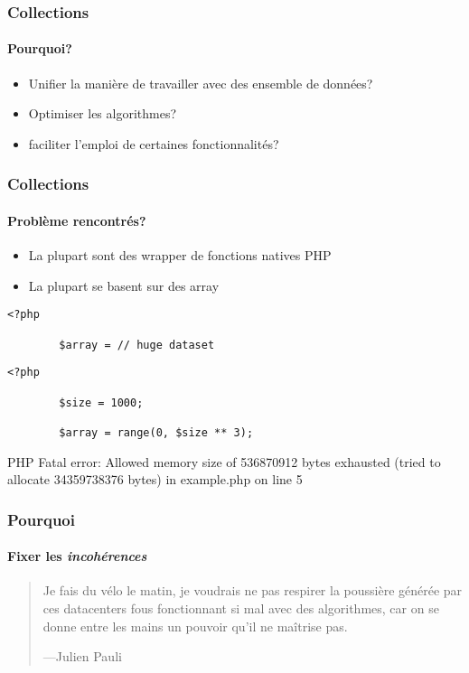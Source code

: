 \begin{frame}
	\frametitle{Collections}
    \framesubtitle{Pourquoi?}

    \begin{itemize}[<+->]
        \item Unifier la manière de travailler avec des ensemble de données?
        \item Optimiser les algorithmes?
        \item faciliter l'emploi de certaines fonctionnalités?
    \end{itemize}
\end{frame}

\begin{frame}
	\frametitle{Collections}
    \framesubtitle{Problème rencontrés?}

    \begin{itemize}[<+->]
        \item La plupart sont des wrapper de fonctions natives PHP
        \item La plupart se basent sur des array
    \end{itemize}
\end{frame}

\begin{frame}[fragile]
    \begin{lstlisting}[firstnumber=1]
        <?php

        $array = // huge dataset
    \end{lstlisting}
\end{frame}

\begin{frame}[fragile]
    \begin{lstlisting}[firstnumber=1]
        <?php

        $size = 1000;

        $array = range(0, $size ** 3);
    \end{lstlisting}
\end{frame}

\begin{frame}[fragile]
    \begin{spverbatim}
        PHP Fatal error: Allowed memory size of 536870912 bytes exhausted (tried to allocate 34359738376 bytes) in example.php on line 5
    \end{spverbatim}
\end{frame}

\begin{frame}
	\frametitle{Pourquoi}
    \framesubtitle{Fixer les \textit{incohérences}}

    \begin{quote}
        Je fais du vélo le matin, je voudrais ne pas respirer la poussière générée
        par ces datacenters fous fonctionnant si mal avec des algorithmes,
        car on se donne entre les mains un pouvoir qu'il ne maîtrise pas.

        \begin{flushright}
            \tiny{---Julien Pauli}
        \end{flushright}
    \end{quote}
\end{frame}

